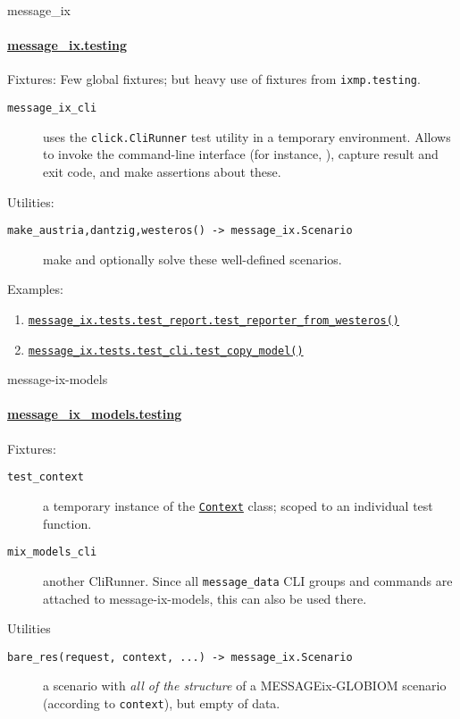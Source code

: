 \documentclass[12pt,aspectratio=169]{beamer}
\renewcommand{\mod}[1]{\texttt{#1}}
\newcommand{\func}[1]{\texttt{#1()}}
\newcommand{\py}[1]{\texttt{#1}}
\begin{document}
\begin{frame}{\ttfamily message\_ix}
\framesubtitle{
\href{https://docs.messageix.org/en/latest/api.html\#module-message_ix.testing}{\ttfamily message\_ix.testing}}

Fixtures:
Few global fixtures; but heavy use of fixtures from \mod{ixmp.testing}.
\begin{description}
  \item [\py{message_ix_cli}] uses the \py{click.CliRunner} test utility in a temporary environment.
  Allows to invoke the  command-line interface (for instance, ), capture result and exit code, and make assertions about these.
\end{description}

\medskip
Utilities:
\begin{description}
  \item [\py{make_{austria,dantzig,westeros}() -> message_ix.Scenario}] make and optionally solve these well-defined scenarios.
\end{description}

\medskip
Examples:
\begin{enumerate}
  \item \href{https://github.com/iiasa/message_ix/blob/a488b8a/message_ix/tests/test_report.py\#L103-L146}{\func{message_ix.tests.test_report.test_reporter_from_westeros}}
  \item \href{https://github.com/iiasa/message_ix/blob/a488b8a87ac34162da05577b0edd5f1012a33d1a/message_ix/tests/test_cli.py\#L11-L50}{\func{message_ix.tests.test_cli.test_copy_model}}
\end{enumerate}
\end{frame}

\begin{frame}{\ttfamily message-ix-models}
\framesubtitle{\href{https://docs.messageix.org/projects/models/en/latest/api/testing.html}{\ttfamily message\_ix\_models.testing}}

Fixtures:
\begin{description}
  \item [\py{test_context}] a temporary instance of the \href{https://docs.messageix.org/projects/models/en/latest/api/util.html\#message_ix_models.util.context.Context}{\py{Context}} class; scoped to an individual test function.
  \item [\py{mix_models_cli}] another CliRunner. Since all \mod{message_data} CLI groups and commands are attached to message-ix-models, this can also be used there.
\end{description}

\medskip
Utilities
\begin{description}
  \item [\py{bare_res(request, context, ...) -> message_ix.Scenario}] a scenario with \emph{all of the structure} of a MESSAGEix-GLOBIOM scenario (according to \py{context}), but empty of data.
\end{description}
\end{frame}
\end{document}
